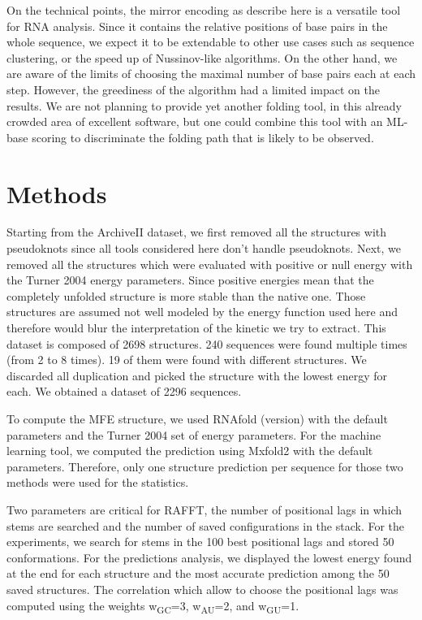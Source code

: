 \documentclass[a4paper,12pt]{article}
\begin{document}
{{On the technical points, the mirror encoding as describe here is a versatile
tool for RNA analysis. Since it contains the relative positions of base pairs in
the whole sequence, we expect it to be extendable to other use cases such as
sequence clustering, or the speed up of Nussinov-like algorithms. On the other
hand, we are aware of the limits of choosing the maximal number of base pairs
each at each step. However, the greediness of the algorithm had a limited impact
on the results. We are not planning to provide yet another folding tool, in this
already crowded area of excellent software, but one could combine this tool with
an ML-base scoring to discriminate the folding path that is likely to be
observed.

\section*{Methods}
\label{sec:orgaa6074d}
Starting from the ArchiveII dataset, we first removed all the structures with
pseudoknots since all tools considered here don't handle pseudoknots. Next, we
removed all the structures which were evaluated with positive or null energy
with the Turner 2004 energy parameters. Since positive energies mean that the
completely unfolded structure is more stable than the native one. Those
structures are assumed not well modeled by the energy function used here and
therefore would blur the interpretation of the kinetic we try to extract. This
dataset is composed of 2698 structures. 240 sequences were found multiple times
(from 2 to 8 times). 19 of them were found with different structures. We
discarded all duplication and picked the structure with the lowest energy for
each. We obtained a dataset of 2296 sequences.

To compute the MFE structure, we used RNAfold (version) with the default
parameters and the Turner 2004 set of energy parameters. For the machine
learning tool, we computed the prediction using Mxfold2 with the default
parameters. Therefore, only one structure prediction per sequence for those two
methods were used for the statistics.

Two parameters are critical for RAFFT, the number of positional lags in which
stems are searched and the number of saved configurations in the stack. For the
experiments, we search for stems in the 100 best positional lags and stored 50
conformations. For the predictions analysis, we displayed the lowest energy
found at the end for each structure and the most accurate prediction among the
50 saved structures. The correlation which allow to choose the positional lags
was computed using the weights w\textsubscript{GC}=3, w\textsubscript{AU}=2, and w\textsubscript{GU}=1.

}}
\end{document}
